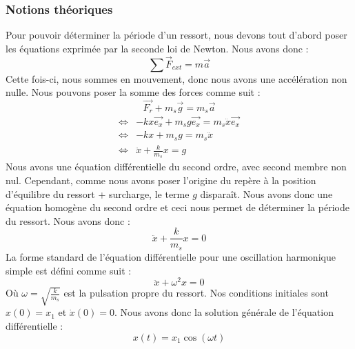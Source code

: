         \subsubsection{Notions théoriques}
            Pour pouvoir déterminer la période d'un ressort, nous devons tout d'abord poser les équations
            exprimée par la seconde loi de Newton. Nous avons donc :
            \begin{equation}
                \sum \vec{F}_{ext} = m \vec{a}
            \end{equation}
            Cette fois-ci, nous sommes en mouvement, donc nous avons une accélération non nulle.
            Nous pouvons poser la somme des forces comme suit :
            \begin{equation}
                \vec{F_r} + m_s\vec{g} = m_s \vec{a}
            \end{equation}
            \begin{align*}
                \Leftrightarrow & -kx \vec{e_x} + m_s g \vec{e_x} = m_s \ddot{x} \vec{e_x} \\
                \Leftrightarrow & -kx + m_s g = m_s \ddot{x} \\
                \Leftrightarrow & \ddot{x} + \frac{k}{m_s}x = g
            \end{align*}
            Nous avons une équation différentielle du second ordre, avec second membre non nul.
            Cependant, comme nous avons poser l'origine du repère à la position d'équilibre du ressort + surcharge,
            le terme $g$ disparaît. Nous avons donc une équation homogène du second ordre et ceci nous permet de
            déterminer la période du ressort. Nous avons donc :
            \begin{equation}
                \ddot{x} + \frac{k}{m_s}x = 0
            \end{equation}
            La forme standard de l'équation différentielle pour une oscillation harmonique simple est défini comme suit :
            \begin{equation}
                \ddot{x} + \omega^2 x = 0
            \end{equation}
            Où $\omega = \sqrt{\frac{k}{m_s}}$ est la pulsation propre du ressort.
            Nos conditions initiales sont $x(0) = x_1$ et $\dot{x}(0) = 0$.
            Nous avons donc la solution générale de l'équation différentielle :
            \begin{equation}
                x(t) = x_1 \cos(\omega t)
            \end{equation}
